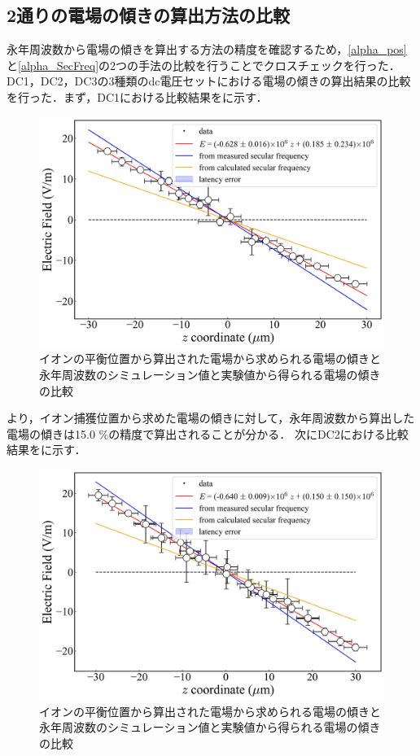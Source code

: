 \subsection{2通りの電場の傾きの算出方法の比較}\label{COMP_alpha}
永年周波数から電場の傾きを算出する方法の精度を確認するため，\ref{alpha_pos}と\ref{alpha_SecFreq}の2つの手法の比較を行うことでクロスチェックを行った．DC1，DC2，DC3の3種類のdc電圧セットにおける電場の傾きの算出結果の比較を行った．まず，DC1における比較結果をに示す．

\begin{figure}[h]
	\begin{center}
		\includegraphics[width = 0.6\linewidth]{./results/figure/DC1_COMP.jpg}
		\caption{イオンの平衡位置から算出された電場から求められる電場の傾きと永年周波数のシミュレーション値と実験値から得られる電場の傾きの比較}
		\label{fig:DC1_COMP}
	\end{center}
\end{figure}

より，イオン捕獲位置から求めた電場の傾きに対して，永年周波数から算出した電場の傾きは15.0 \%の精度で算出されることが分かる．
%
\clearpage
%
次にDC2における比較結果をに示す．

\begin{figure}[h]
	\begin{center}
		\includegraphics[width = 0.6\linewidth]{./results/figure/DC2_COMP.jpg}
		\caption{イオンの平衡位置から算出された電場から求められる電場の傾きと永年周波数のシミュレーション値と実験値から得られる電場の傾きの比較}
		\label{fig:DC2_COMP}
	\end{center}
\end{figure}

